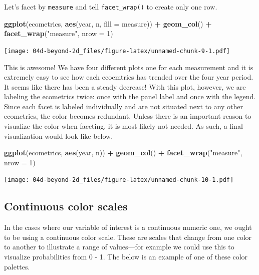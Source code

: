 \documentclass[
]{book}
\newenvironment{Shaded}{\begin{snugshade}}{\end{snugshade}}
\newcommand{\DataTypeTok}[1]{\textcolor[rgb]{0.13,0.29,0.53}{#1}}
\newcommand{\DecValTok}[1]{\textcolor[rgb]{0.00,0.00,0.81}{#1}}
\newcommand{\KeywordTok}[1]{\textcolor[rgb]{0.13,0.29,0.53}{\textbf{#1}}}
\newcommand{\NormalTok}[1]{#1}
\newcommand{\OperatorTok}[1]{\textcolor[rgb]{0.81,0.36,0.00}{\textbf{#1}}}
\newcommand{\StringTok}[1]{\textcolor[rgb]{0.31,0.60,0.02}{#1}}
\begin{document}
Let's facet by \texttt{measure} and tell \texttt{facet\_wrap()} to create only one row.

\begin{Shaded}
\begin{Highlighting}[]
\KeywordTok{ggplot}\NormalTok{(ecometrics, }\KeywordTok{aes}\NormalTok{(year, n, }\DataTypeTok{fill =}\NormalTok{ measure)) }\OperatorTok{+}
\StringTok{  }\KeywordTok{geom\_col}\NormalTok{() }\OperatorTok{+}\StringTok{ }
\StringTok{  }\KeywordTok{facet\_wrap}\NormalTok{(}\StringTok{"measure"}\NormalTok{, }\DataTypeTok{nrow =} \DecValTok{1}\NormalTok{)}
\end{Highlighting}
\end{Shaded}

\texttt{[image: 04d-beyond-2d\_files/figure-latex/unnamed-chunk-9-1.pdf]}

This is awesome! We have four different plots one for each measurement and it is extremely easy to see how each ecoemtrics has trended over the four year period. It seems like there has been a steady decrease! With this plot, however, we are labeling the ecometrics twice: once with the panel label and once with the legend. Since each facet is labeled individually and are not situated next to any other ecometrics, the color becomes redundant. Unless there is an important reason to visualize the color when faceting, it is most likely not needed. As such, a final visualization would look like below.

\begin{Shaded}
\begin{Highlighting}[]
\KeywordTok{ggplot}\NormalTok{(ecometrics, }\KeywordTok{aes}\NormalTok{(year, n)) }\OperatorTok{+}
\StringTok{  }\KeywordTok{geom\_col}\NormalTok{() }\OperatorTok{+}\StringTok{ }
\StringTok{  }\KeywordTok{facet\_wrap}\NormalTok{(}\StringTok{"measure"}\NormalTok{, }\DataTypeTok{nrow =} \DecValTok{1}\NormalTok{)}
\end{Highlighting}
\end{Shaded}

\texttt{[image: 04d-beyond-2d\_files/figure-latex/unnamed-chunk-10-1.pdf]}

\hypertarget{continuous-color-scales}{%
\subsection{Continuous color scales}\label{continuous-color-scales}}

In the cases where our variable of interest is a continuous numeric one, we ought to be using a continuous color scale. These are scales that change from one color to another to illustrate a range of values---for example we could use this to visualize probabilities from 0 - 1. The below is an example of one of these color palettes.
\end{document}
